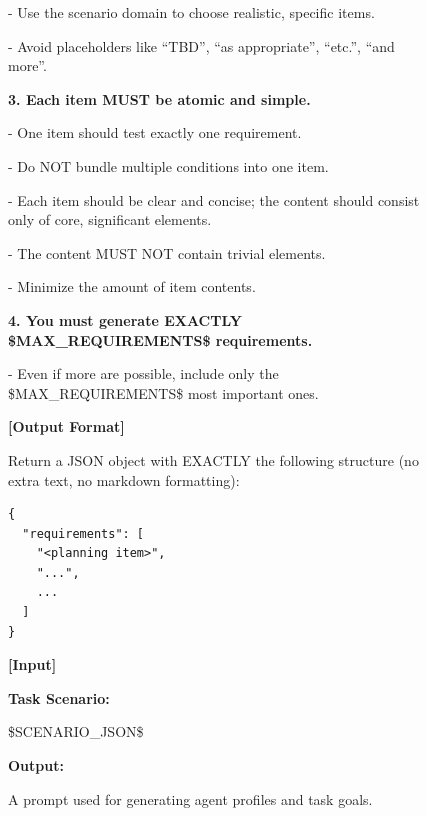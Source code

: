 \begin{figure}[t]
\begin{tcolorbox}[
  colframe=black,
  colback=gray!10,
  arc=2mm,
  boxrule=1.5pt,
  title=\textbf{Prompts},
  fonttitle=\bfseries,
]
- Use the scenario domain to choose realistic, specific items.

- Avoid placeholders like ``TBD'', ``as appropriate'', ``etc.'', ``and more''.
\par\smallskip

\textbf{3. Each item MUST be atomic and simple.}

- One item should test exactly one requirement.

- Do NOT bundle multiple conditions into one item.

- Each item should be clear and concise; the content should consist only of core, significant elements.

- The content MUST NOT contain trivial elements.

- Minimize the amount of item contents.
\par\smallskip

\textbf{4. You must generate EXACTLY \$MAX\_REQUIREMENTS\$ requirements.}

- Even if more are possible, include only the \$MAX\_REQUIREMENTS\$ most important ones.
\par\smallskip
\textbf{[Output Format]}

Return a JSON object with EXACTLY the following structure (no extra text, no markdown formatting):

\begin{verbatim}
{
  "requirements": [
    "<planning item>",
    "...",
    ...
  ]
}
\end{verbatim}

\par\smallskip


\textbf{[Input]}

\textbf{Task Scenario:}

\$SCENARIO\_JSON\$

\par\smallskip


\textbf{Output:}


\end{tcolorbox}
\caption{A prompt used for generating agent profiles and task goals.}
\label{fig:prompt_dataset_2}
\end{figure}